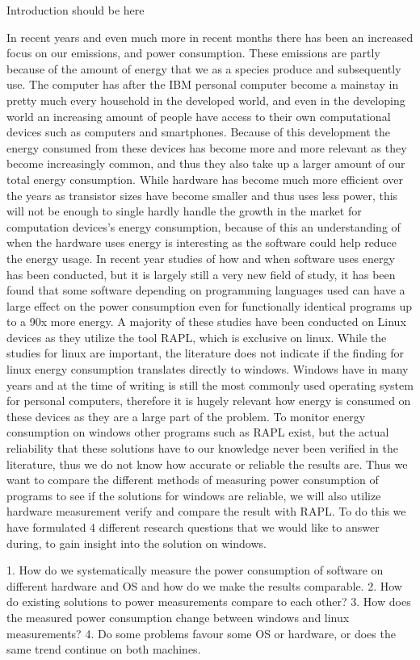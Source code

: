 
Introduction should be here

In recent years and even much more in recent months there has been an increased focus on our emissions, and power consumption. 
These emissions are partly because of the amount of energy that we as a species produce and subsequently use. 
The computer has after the IBM personal computer become a mainstay in pretty much every household in the developed world, and even in the developing world an increasing amount of people have access to their own computational devices such as computers and smartphones. 
Because of this development the energy consumed from these devices has become more and more relevant as they become increasingly common, and thus they also take up a larger amount of our total energy consumption. 
While hardware has become much more efficient over the years as transistor sizes have become smaller and thus uses less power, this will not be enough to single hardly handle the growth in the market for computation devices's energy consumption, because of this an understanding of when the hardware uses energy is interesting as the software could help reduce the energy usage. 
In recent year studies of how and when software uses energy has been conducted, but it is largely still a very new field of study, it has been found that some software depending on programming languages used can have a large effect on the power consumption even for functionally identical programs up to a 90x more energy. 
A majority of these studies have been conducted on Linux devices as they utilize the tool RAPL, which is exclusive on linux. While the studies for linux are important, the literature does not indicate if the finding for linux energy consumption translates directly to windows. 
Windows have in many years and at the time of writing is still the most commonly used operating system for personal computers, therefore it is hugely relevant how energy is consumed on these devices as they are a large part of the problem. To monitor energy consumption on windows other programs such as RAPL exist, but the actual reliability that these solutions have to our knowledge never been verified in the literature, thus we do not know how accurate or reliable the results are. 
Thus we want to compare the different methods of measuring power consumption of programs to see if the solutions for windows are reliable, we will also utilize hardware measurement verify and compare the result with RAPL. 
To do this we have formulated 4 different research questions that we would like to answer during, to gain insight into the solution on windows.
 
1. How do we systematically measure the power consumption of software on different hardware and OS and how do we make the results comparable.
2. How do existing solutions to power measurements compare to each other?
3. How does the measured power consumption change between windows and linux measurements?
4. Do some problems favour some OS or hardware, or does the same trend continue on both machines.
